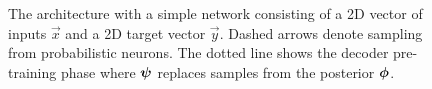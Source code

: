 \begin{figure}
\caption{The \dettostoc{} architecture with a simple network consisting of a 2D vector of inputs $\vec{x}$ and a 2D target vector $\vec{y}$. Dashed arrows denote sampling from probabilistic neurons. The dotted line shows the decoder pre-training phase where $\boldsymbol{\psi}$ replaces samples from the posterior $\boldsymbol{\phi}$.}
\label{fig:det2stoc_architecture}
\end{figure}




        

